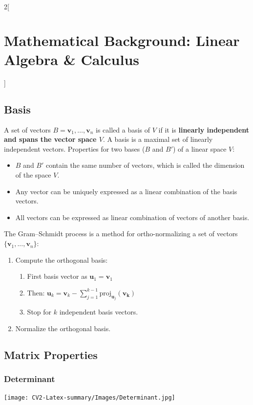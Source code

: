 \documentclass[oneside,fontsize=11pt,paper=a4]{scrartcl}
\begin{document}
\begin{multicols}{2}[\section{Mathematical Background: Linear Algebra \& Calculus}]
\subsection{Basis}
A set of vectors $B = {\mathbf{v}_1, \dots, \mathbf{v}_n}$ is called a basis of $V$ if it is \textbf{linearly independent and spans the vector space $V$}. A basis is a maximal set of linearly independent vectors. Properties for two bases ($B$ and $B'$) of a linear space $V$:
\begin{itemize}
	\item $B$ and $B'$ contain the same number of vectors, which is called the dimension of the space $V$.
	\item Any vector can be uniquely expressed as a linear combination of the basis vectors.
	\item All vectors can be expressed as linear combination of vectors of another basis.
\end{itemize}
The Gram–Schmidt process is a method for ortho-normalizing a set of vectors $\{\mathbf{v}_1, ..., \mathbf{v}_n\}$:
\begin{enumerate}
    \item Compute the orthogonal basis: 
        \begin{enumerate}
            \item First basis vector as $\mathbf{u}_1=\mathbf{v}_1$
            \item Then: $\mathbf{u}_k=\mathbf{v}_k-\sum^{k-1}_{j=1}\text{proj}_{\mathbf{u}_j}(\mathbf{v_k})$
            \item Stop for $k$ independent basis vectors.
        \end{enumerate}
    \item Normalize the orthogonal basis.
\end{enumerate}




\subsection{Matrix Properties}

\subsubsection{Determinant}

\begin{center}
    \texttt{[image: CV2-Latex-summary/Images/Determinant.jpg]}
\end{center}


\end{multicols}
\end{document}
